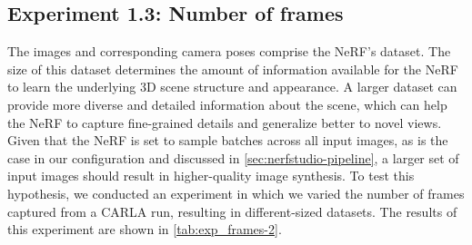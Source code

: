 










\subsection{Experiment 1.3: Number of frames} \label{sec:exp-number-of-frames}
The images and corresponding camera poses comprise the NeRF's dataset. The size of this dataset determines the amount of information available for the NeRF to learn the underlying 3D scene structure and appearance. A larger dataset can provide more diverse and detailed information about the scene, which can help the NeRF to capture fine-grained details and generalize better to novel views. Given that the NeRF is set to sample batches across all input images, as is the case in our configuration and discussed in \autoref{sec:nerfstudio-pipeline}, a larger set of input images should result in higher-quality image synthesis. To test this hypothesis, we conducted an experiment in which we varied the number of frames captured from a CARLA run, resulting in different-sized datasets. The results of this experiment are shown in \autoref{tab:exp_frames-2}.


